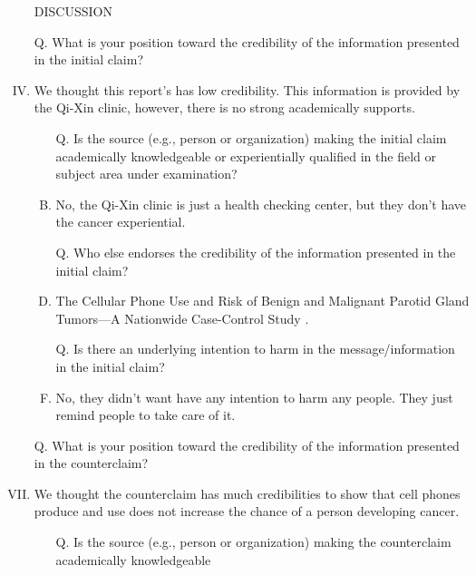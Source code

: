 \documentclass[a4paper, 12pt]{article}
\begin{document}
\begin{CJK*}{UTF8}{bsmi}
\begin{enumerate}[I.]
            \item [] %
            \item [] DISCUSSION
            \item [Q.] What is your position toward the credibility of the information presented in the {\color{blue}initial claim}?
            \item We thought this report's has low credibility. This information is provided by the Qi-Xin clinic, however,
                  there is no strong academically supports.
                  \begin{enumerate}[A.]
                        \item [Q.] Is the source (e.g., person or organization) making the {\color{blue}initial claim} academically knowledgeable
                              or experientially qualified in the field or subject area under examination?
                        \item No, the Qi-Xin clinic is just a health checking center, but they don't have the cancer experiential.
                        \item [Q.] Who else endorses the credibility of the information presented in the {\color{blue}initial claim}?
                        \item The Cellular Phone Use and Risk of Benign and Malignant Parotid Gland Tumors—A Nationwide Case-Control Study \parencite{10.1093/aje/kwm325}.
                        \item [Q.] Is there an underlying intention to harm in the message/information in the {\color{blue}initial claim}?
                        \item No, they didn't want have any intention to harm any people. They just remind people to take care of it.
                  \end{enumerate}
            \item []
            \item [Q.] What is your position toward the credibility of the information presented in the {\color{red} counterclaim}?
            \item We thought the counterclaim has much credibilities to show that cell phones produce and use does
                  not increase the chance of a person developing cancer.
                  \begin{enumerate}[A.]
                        \item [Q.] Is the source (e.g., person or organization) making the {\color{red}counterclaim} academically knowledgeable

\end{enumerate}
\end{enumerate}
\end{CJK*}
\end{document}
